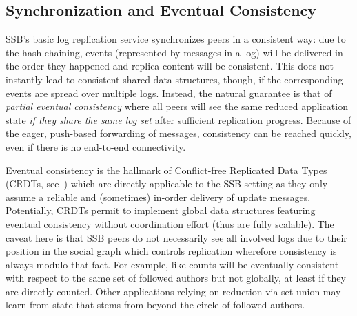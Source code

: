 \documentclass[9pt,sigconf]{acmart}
\begin{document}

\subsection{Synchronization and Eventual Consistency}
\label{Section:Tangle}

SSB's basic log replication service synchronizes peers in a consistent
way: due to the hash chaining, events (represented by messages in a log)
will be delivered in the order they happened and replica content will
be consistent. This does not instantly lead to consistent shared data
structures, though, if the corresponding events are spread over
multiple logs. Instead, the natural guarantee is that of {\em partial eventual
consistency} where all peers will see the same reduced application
state {\em if they share the same log set} after sufficient replication
progress. Because of the eager, push-based forwarding of messages, consistency
can be reached quickly, even if there is no end-to-end connectivity.

Eventual consistency is the hallmark of Conflict-free Replicated Data
Types (CRDTs, see~\cite{shapiro2011conflict}) which are directly applicable to the SSB
setting as they only assume a reliable and (sometimes) in-order
delivery of update messages. Potentially, CRDTs permit to implement
global data structures featuring eventual consistency without
coordination effort (thus are fully scalable). The caveat here is that
SSB peers do not necessarily see all involved logs due to their
position in the social graph which controls replication wherefore
consistency is always modulo that fact. For example, like counts will
be eventually consistent with respect to the same set of followed
authors but not globally, at least if they are directly counted. Other
applications relying on reduction via set union may learn from state
that stems from beyond the circle of followed authors.
\end{document}
